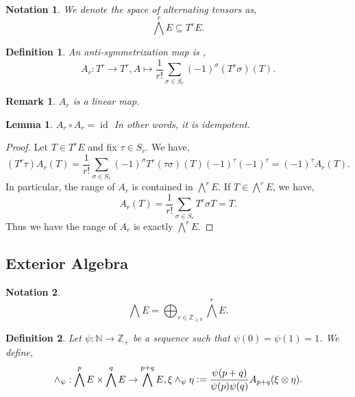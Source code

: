 \documentclass[10pt]{article}
\newtheorem{definition}{Definition}[section]
\newtheorem{lemma}{Lemma}[section]
\newtheorem{notation}{Notation}[section]
\newtheorem{remark}{Remark}[section]
\DeclareMathOperator{\id}{id}
\newcommand{\defeq}{\vcentcolon=}
\newcommand{\N}[0]{\mathbb{N}}
\newcommand{\Z}[0]{\mathbb{Z}}
\begin{document}
\begin{notation}
  We denote the space of alternating tensors as,
  \begin{equation*}
    \bigwedge^r E \subseteq T^rE.
  \end{equation*}
\end{notation}

\begin{definition}
  An anti-symmetrization map is ,
  \begin{equation*}
    A_r:T^r\to T^r, A\mapsto {\frac 1 {r!}}\sum_{\sigma\in S_r}(-1)^\sigma (T^r\sigma)(T).
  \end{equation*}
\end{definition}

\begin{remark}
  $A_r$ is a linear map.
\end{remark}

\begin{lemma}
  $A_r\circ A_r = \id$ In other words, it is idempotent.
\end{lemma}

\begin{proof}
  Let $T\in T^rE$ and fix $\tau\in S_r$. We have,
  \begin{equation*}
    (T^r\tau)A_r(T) = {\frac 1 {r!}}\sum_{\sigma\in S_r}(-1)^\sigma T^r(\tau\sigma)(T)(-1)^{\tau}(-1)^{\tau} = (-1)^\tau A_r(T).
  \end{equation*}
  In particular, the range of $A_r$ is contained in $\bigwedge^r E$. If $T\in\bigwedge^rE$, we have,
  \begin{equation*}
    A_r(T) = {\frac 1 {r!}}\sum_{\sigma\in S_r} T^r\sigma T = T.
  \end{equation*}
  Thus we have the range of $A_r$ is exactly $\bigwedge^rE$.
\end{proof}

\subsection{Exterior Algebra}

\begin{notation}
  \begin{equation*}
    \bigwedge E = \bigoplus_{r\in\Z_{\geq0}}\bigwedge^rE.
  \end{equation*}
\end{notation}

\begin{definition}
  Let $\psi:\N\to \Z_+$ be a sequence such that $\psi(0)=\psi(1) = 1$. We define,
  \begin{equation*}
    \wedge_\psi:\bigwedge^pE\times \bigwedge^q E \to\bigwedge^{p+q}E, \xi\wedge_\psi \eta \defeq {\frac {\psi(p+q)} {\psi(p)\psi(q)}}A_{p+q}(\xi\otimes\eta).
  \end{equation*}
\end{definition}
\end{document}

